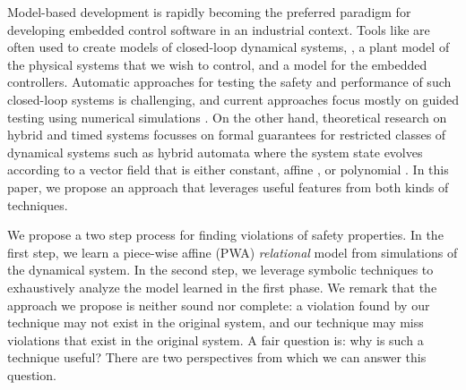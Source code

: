 


Model-based development is rapidly becoming the preferred paradigm for
developing embedded control software in an industrial context.  Tools
like \SIMULINK are often used to create models of closed-loop
dynamical systems, \ie, a plant model of the physical systems that we
wish to control, and a model for the embedded controllers.  Automatic
approaches for testing the safety and performance of such closed-loop
systems is challenging, and current approaches focus mostly on guided
testing using numerical simulations
\cite{annpureddy2011s,donze2010breach,deshmukh2015stochastic,dreossi2015efficient,akazaki}.
On the other hand, theoretical research on hybrid and timed systems
focusses on formal guarantees for restricted classes of dynamical
systems such as hybrid automata where the system state evolves
according to a vector field that is either constant, affine
\cite{frehse2011spaceex}, or polynomial \cite{chen2015reachability}.
In this paper, we propose an approach that leverages useful features
from both kinds of techniques.

We propose a two step process for finding violations of safety
properties. In the first step, we learn a piece-wise affine (PWA) {\em
relational} model from simulations of the dynamical system. In the
second step, we leverage symbolic techniques to exhaustively analyze
the model learned in the first phase. We remark that the approach we
propose is neither sound nor complete: a violation found by our
technique may not exist in the original system, and our technique may
miss violations that exist in the original system. A fair question is:
why is such a technique useful? There are two perspectives from which
we can answer this question.

